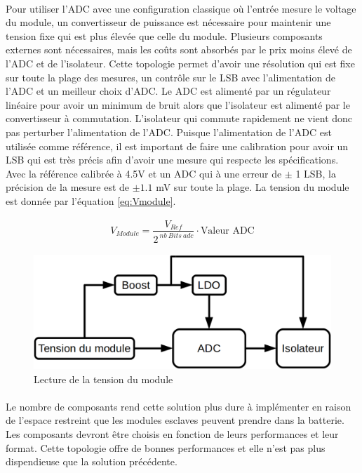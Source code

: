 	\paragraph*{}
	Pour utiliser l'ADC avec une configuration classique où l'entrée mesure le voltage du module, un convertisseur de puissance est nécessaire pour maintenir une tension fixe qui est plus élevée que celle du module. Plusieurs composants externes sont nécessaires, mais les coûts sont absorbés par le prix moins élevé de l'ADC et de l'isolateur. Cette topologie permet d'avoir une résolution qui est fixe sur toute la plage des mesures, un contrôle sur le LSB avec l'alimentation de l'ADC et un meilleur choix d'ADC. Le ADC est alimenté par un régulateur linéaire pour avoir un minimum de bruit alors que l'isolateur est alimenté par le convertisseur à commutation. L'isolateur qui commute rapidement ne vient donc pas perturber l'alimentation de l'ADC. Puisque l'alimentation de l'ADC  est utilisée comme référence, il est important de faire une calibration pour avoir un LSB qui est très précis afin d'avoir une mesure qui respecte les spécifications. Avec la référence calibrée à 4.5V et un ADC qui à une erreur de $\pm$ 1 LSB, la précision de la mesure est de $\pm 1.1$ mV sur toute la plage. La tension du module est donnée par l'équation \ref{eq:Vmodule}.
	
	\begin{align}
		V_{Module} = \dfrac{V_{Ref}}{2^{~nb~Bits~adc}} \cdot \text{Valeur ADC}
		\label{eq:Vmodule}
	\end{align}
	
	\begin{figure}[H]
		\centering
		\includegraphics[scale=0.3]{Images/Tension_module.png}
		\caption{Lecture de la tension du module}
		\label{fig:adc_vmod}
	\end{figure}	

	\paragraph*{}
	Le nombre de composants rend cette solution plus dure à implémenter en raison de l'espace restreint que les modules esclaves peuvent prendre dans la batterie. Les composants devront être choisis en fonction de leurs performances et leur format. Cette topologie offre de bonnes performances et elle n'est pas plus dispendieuse que la solution précédente. 
	
